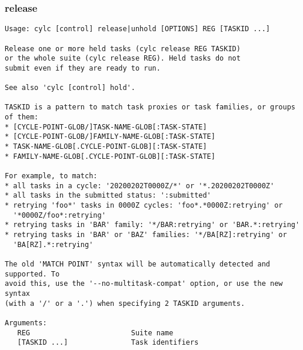 \subsubsection{release}
\label{release}
\begin{lstlisting}
Usage: cylc [control] release|unhold [OPTIONS] REG [TASKID ...] 

Release one or more held tasks (cylc release REG TASKID)
or the whole suite (cylc release REG). Held tasks do not
submit even if they are ready to run.

See also 'cylc [control] hold'.

TASKID is a pattern to match task proxies or task families, or groups of them:
* [CYCLE-POINT-GLOB/]TASK-NAME-GLOB[:TASK-STATE]
* [CYCLE-POINT-GLOB/]FAMILY-NAME-GLOB[:TASK-STATE]
* TASK-NAME-GLOB[.CYCLE-POINT-GLOB][:TASK-STATE]
* FAMILY-NAME-GLOB[.CYCLE-POINT-GLOB][:TASK-STATE]

For example, to match:
* all tasks in a cycle: '20200202T0000Z/*' or '*.20200202T0000Z'
* all tasks in the submitted status: ':submitted'
* retrying 'foo*' tasks in 0000Z cycles: 'foo*.*0000Z:retrying' or
  '*0000Z/foo*:retrying'
* retrying tasks in 'BAR' family: '*/BAR:retrying' or 'BAR.*:retrying'
* retrying tasks in 'BAR' or 'BAZ' families: '*/BA[RZ]:retrying' or
  'BA[RZ].*:retrying'

The old 'MATCH POINT' syntax will be automatically detected and supported. To
avoid this, use the '--no-multitask-compat' option, or use the new syntax
(with a '/' or a '.') when specifying 2 TASKID arguments.

Arguments:
   REG                        Suite name
   [TASKID ...]               Task identifiers


\end{lstlisting}
